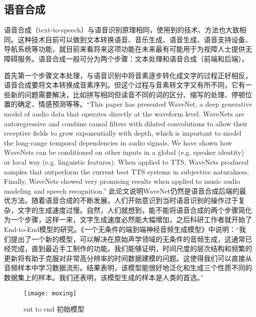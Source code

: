 \documentclass{article}
\begin{document}
\subsection{语音合成}
语音合成（text-to-speech）与语音识别原理相同，使用到的技术、方法也大致相同。这种技术目前可以做到文本转换语音、音乐生成、语音生成、语音支持设备、导航系统等功能，就目前来看将来这项功能在未来最有可能用于为视障人士提供无障碍服务。语音合成一般可分为两个步骤：文本处理和语音合成（前端和后端）。\par
首先第一个步骤文本处理，与语音识别中将音素逐步转化成文字的过程正好相反，语音合成要将文本转换成音素序列。但这个过程与音素转文字又有所不同，它有一些新的问题需要解决，比如拼写相同但读音不同的词的区分、缩写的处理、停顿位置的确定、情感预测等等。“This paper has presented WaveNet, a deep generative model of audio data that operates directly at the waveform level. WaveNets are autoregressive and combine causal filters with dilated convolutions to allow their receptive fields to grow exponentially with depth, which is important to model the long-range temporal dependencies in audio signals. We have shown how WaveNets can be conditioned on other inputs in a global (e.g. speaker identity) or local way (e.g. linguistic features). When applied to TTS, WaveNets produced samples that outperform the current best TTS systems in subjective naturalness. Finally, WaveNets showed very promising results when applied to music audio modeling and speech recognition.” \citep{houduan}   此论文说明WaveNet仍然是语音合成后端的最优方法。随着语音合成的不断发展，人们开始意识到当时语音识别的操作过于复杂，文字的生成速度过慢。自然，人们就想到，能不能将语音合成的两个步骤简化为一个步骤，这样一来，文字生成速度必然能大幅增加，之后科研工作者就开始了End-to-End模型的研究。《一个无条件的端到端神经音频生成模型》\citep{end}中说明：“我们提出了一个新的模型，可以解决在原始声学领域的无条件的音频生成，这通常已经完成，直到最近手工制作的功能。我们能够证明，时间尺度的层次结构和频繁的更新将有助于克服对非常高分辨率的时间数据建模的问题。这使得我们可以直接从音频样本中学习数据流形。结果表明，该模型能很好地泛化和生成三个性质不同的数据集上的样本。我们还表明，该模型生成的样本是人类的首选。”\par
\begin{figure}[h]
	\centering
	\texttt{[image: moxing]}
	\caption{ent to end 初始模型}
\end{figure}
\end{document}
